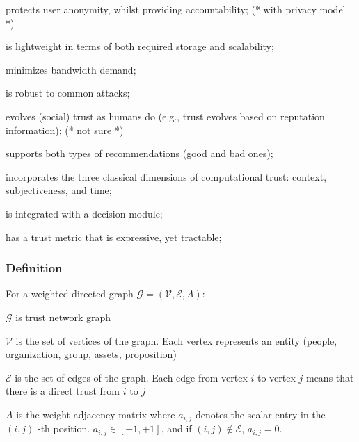\documentclass{article}
\begin{document}
\item protects user anonymity, whilst providing accountability; (* with privacy model *)


\item is lightweight in terms of both required storage and scalability;


\item minimizes bandwidth demand;


\item is robust to common attacks;


\item evolves (social) trust as humans do (e.g., trust evolves based on reputation information); (* not sure *)


\item supports both types of recommendations (good and bad ones);


\item incorporates the three classical dimensions of computational trust: context, subjectiveness, and time;


\item is integrated with a decision module;


\item has a trust metric that is expressive, yet tractable;


\subsubsection{Definition}



For a weighted directed graph \(\mathcal{G}=(\mathcal{V},\mathcal{E},A)\):


\item \(\mathcal{G}\) is trust network graph


\item \(\mathcal{V}\) is the set of vertices of the graph. Each vertex represents an entity (people, organization, group, assets, proposition)


\item \(\mathcal{E}\) is the set of edges of the graph. Each edge from vertex \(i\) to vertex \(j\) means that there is a direct trust from \(i\)
to \(j\)


\item \(A\) is the weight adjacency matrix where \(a_{i,j}\) denotes the scalar entry in the \((i,j)\) -th position. \(a_{i,j}\in [-1,+1]\), and
if \((i,j)\notin \mathcal{E}\), \(a_{i,j}=0\).
\end{document}
